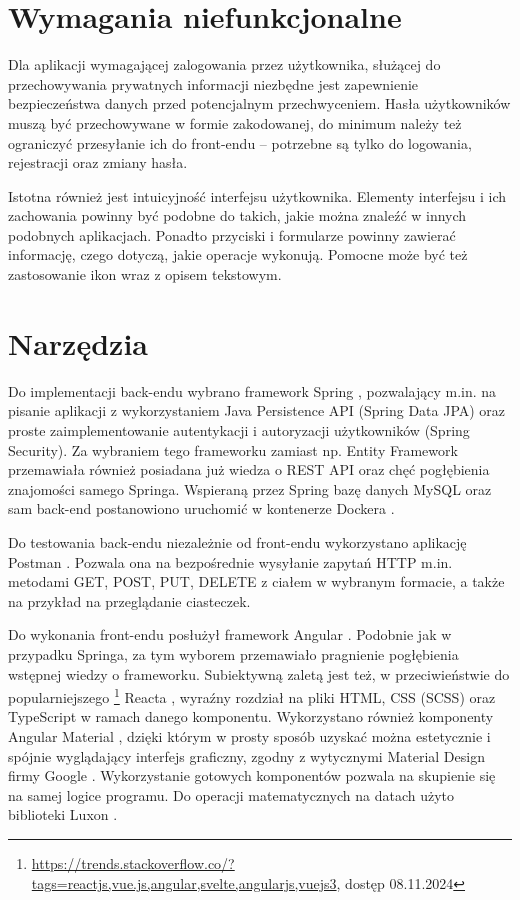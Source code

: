 \documentclass[a4paper,twoside,12pt]{book}
\begin{document}
\section{Wymagania niefunkcjonalne}

Dla aplikacji wymagającej zalogowania przez użytkownika, służącej do przechowywania prywatnych informacji niezbędne jest zapewnienie bezpieczeństwa danych przed potencjalnym przechwyceniem. Hasła użytkowników muszą być przechowywane w formie zakodowanej, do minimum należy też ograniczyć przesyłanie ich do front-endu -- potrzebne są tylko do logowania, rejestracji oraz zmiany hasła.

Istotna również jest intuicyjność interfejsu użytkownika. Elementy interfejsu i ich zachowania powinny być podobne do takich, jakie można znaleźć w innych podobnych aplikacjach. Ponadto przyciski i formularze powinny zawierać informację, czego dotyczą, jakie operacje wykonują. Pomocne może być też zastosowanie ikon wraz z opisem tekstowym.

\section{Narzędzia}

Do implementacji back-endu wybrano framework Spring \cite{bib:spring}, pozwalający m.in. na pisanie aplikacji z wykorzystaniem Java Persistence API (Spring Data JPA) oraz proste zaimplementowanie autentykacji i autoryzacji użytkowników (Spring Security). Za wybraniem tego frameworku zamiast np. Entity Framework \cite{bib:entityframework} przemawiała również posiadana już wiedza o REST API oraz chęć pogłębienia znajomości samego Springa.
Wspieraną przez Spring bazę danych MySQL \cite{bib:mysql} oraz sam back-end postanowiono uruchomić w kontenerze Dockera \cite{bib:docker}.

Do testowania back-endu niezależnie od front-endu wykorzystano aplikację Postman \cite{bib:postman}. Pozwala ona na bezpośrednie wysyłanie zapytań HTTP m.in. metodami GET, POST, PUT, DELETE z ciałem w wybranym formacie, a także na przykład na przeglądanie ciasteczek.

Do wykonania front-endu posłużył framework Angular \cite{bib:angularnew,bib:angularold}. Podobnie jak w przypadku Springa, za tym wyborem przemawiało pragnienie pogłębienia wstępnej wiedzy o frameworku. Subiektywną zaletą jest też, w przeciwieństwie do popularniejszego \footnote{\url{https://trends.stackoverflow.co/?tags=reactjs,vue.js,angular,svelte,angularjs,vuejs3}, dostęp 08.11.2024} Reacta \cite{bib:react}, wyraźny rozdział na pliki HTML, CSS (SCSS) oraz TypeScript w ramach danego komponentu. 
Wykorzystano również komponenty Angular Material \cite{bib:angularmaterial}, dzięki którym w prosty sposób uzyskać można estetycznie i spójnie wyglądający interfejs graficzny, zgodny z wytycznymi Material Design firmy Google \cite{bib:material}. Wykorzystanie gotowych komponentów pozwala na skupienie się na samej logice programu. Do operacji matematycznych na datach użyto biblioteki Luxon \cite{bib:luxon}.
\end{document}
